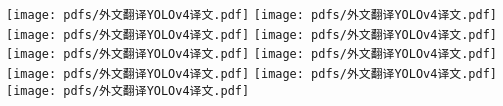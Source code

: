 

{\centering
\texttt{[image: pdfs/外文翻译YOLOv4译文.pdf]}
\texttt{[image: pdfs/外文翻译YOLOv4译文.pdf]}
\texttt{[image: pdfs/外文翻译YOLOv4译文.pdf]}
\texttt{[image: pdfs/外文翻译YOLOv4译文.pdf]}
\texttt{[image: pdfs/外文翻译YOLOv4译文.pdf]}
\texttt{[image: pdfs/外文翻译YOLOv4译文.pdf]}
\texttt{[image: pdfs/外文翻译YOLOv4译文.pdf]}
\texttt{[image: pdfs/外文翻译YOLOv4译文.pdf]}
\texttt{[image: pdfs/外文翻译YOLOv4译文.pdf]}
}

